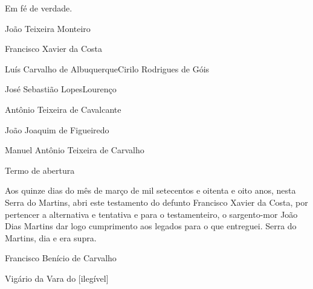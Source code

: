\begin{refsection}
    \vspace{1em}

    \noindent{}\hspace{45ex}Em fé de verdade.

    \vspace{2em}

    \noindent{}\hspace{45ex}

    \vspace{2em}

    \noindent{}\hspace{45ex}João Teixeira Monteiro

    \noindent{}Francisco Xavier da Costa

    \noindent{}Luís Carvalho de Albuquerque\tabto{45ex}Cirilo Rodrigues de Góis

    \noindent{}José Sebastião Lopes\tabto{45ex}Lourenço
    
    \noindent{}Antônio Teixeira de Cavalcante

    \noindent{}João Joaquim de Figueiredo

    \noindent{}Manuel Antônio Teixeira de Carvalho

    \vspace{10mm}

    \noindent{}Termo de abertura

    \vspace{1em}

    \noindent{}Aos quinze dias do mês de março de mil setecentos e oitenta e oito anos, nesta Serra do Martins, abri este testamento do defunto Francisco Xavier da Costa, por pertencer a alternativa e tentativa e para o testamenteiro, o sargento-mor João Dias Martins dar logo cumprimento aos legados para o que entreguei. Serra do Martins, dia e era supra.

    \vspace{1em}

    \noindent{}\hspace{45ex}Francisco Benício de Carvalho

    \noindent{}\hspace{45ex}Vigário da Vara do [ilegível]

    \vspace{1em}


\end{refsection}
